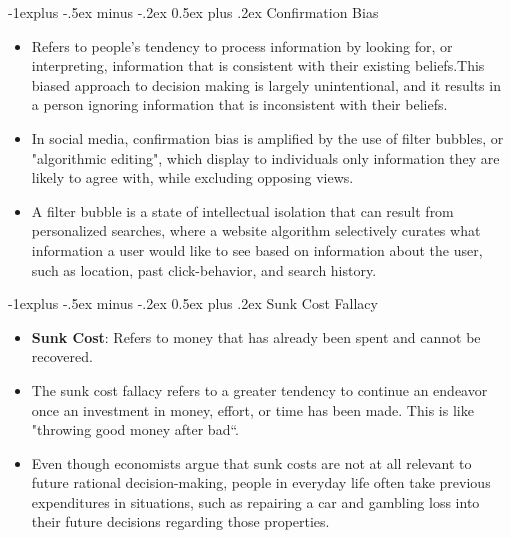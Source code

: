 \documentclass[12pt, landscape]{article}
\makeatletter
\renewcommand{\subsection}{\@startsection{subsection}{2}{0mm}%
                                {-1explus -.5ex minus -.2ex}%
                                {0.5ex plus .2ex}%
                                {\normalfont\normalsize\bfseries}}
\makeatother
\begin{document}
\begin{multicols*}{3}
\subsection{Confirmation Bias}
\begin{itemize}
\item Refers to people's tendency to process information by looking for, or interpreting, information that is consistent with their existing beliefs.This biased approach to decision making is largely unintentional, and it results in a person ignoring information that is inconsistent with their beliefs.
\item In social media, confirmation bias is amplified by the use of filter bubbles, or "algorithmic editing", which display to individuals only information they are likely to agree with, while excluding opposing views.\item A filter bubble is a state of intellectual isolation that can result from personalized searches, where a website algorithm selectively curates what information a user would like to see based on information about the user, such as location, past click-behavior, and search history.
\end{itemize}
\subsection{Sunk Cost Fallacy}
\begin{itemize}
\item \textbf{Sunk Cost}: Refers to money that has already been spent and cannot be recovered.
\item The sunk cost fallacy refers to a greater tendency to continue an endeavor once an investment in money, effort, or time has been made. This is like "throwing good money after bad“.
\item Even though economists argue that sunk costs are not at all relevant to future rational decision-making, people in everyday life often take previous expenditures in situations, such as repairing a car and gambling loss into their future decisions regarding those properties.
\end{itemize}

\end{multicols*}
\end{document}
